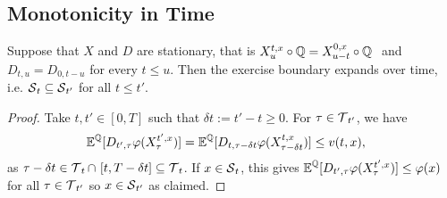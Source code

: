 \subsection{Monotonicity in Time}

\begin{proposition}\label{prop:monot}
Suppose that  $X$ and $D$ are stationary, that is $   
        X_u^{t,x} \circ \operatorname{\mathbb{Q}} = X_{u-t}^{0,x} \circ  \operatorname{\mathbb{Q}} \ $  and $D_{t,u} = D_{0,t-u}$ for every $t \le u $. 
Then the exercise boundary  expands over time, i.e. 
$ \operatorname{\mathcal{S}}_t \subseteq \operatorname{\mathcal{S}}_{t'}$ for all $t \le  t' $.

\end{proposition}
\begin{proof}
Take $t,t'\in [0,T]$ such that $\delta t := t'-t \ge 0$. %
 For  $\tau \in \operatorname{\mathcal{T}}_{t'}$, we have
\begin{align*}
    \operatorname{\mathbb{E}}^{\operatorname{\mathbb{Q}}}[D_{t',\tau}\varphi(X^{t',x}_{\tau})] &= \operatorname{\mathbb{E}}^{\operatorname{\mathbb{Q}}}[D_{t,\tau - \delta t }\varphi(X^{t,x}_{\tau - \delta t})] \le v(t,x), 
\end{align*}
as $\tau - \delta t \in \operatorname{\mathcal{T}}_t \cap \ [t,T-\delta t] \subseteq \operatorname{\mathcal{T}}_t$. If  $x\in \operatorname{\mathcal{S}}_t$, this gives   
$\operatorname{\mathbb{E}}^{\operatorname{\mathbb{Q}}}[D_{t',\tau}\varphi(X^{t',x}_{\tau})] \le  \varphi(x)$ for all $ \tau \in \operatorname{\mathcal{T}}_{t'} $ so  $x \in \operatorname{\mathcal{S}}_{t'}$ as claimed. 
\end{proof}


